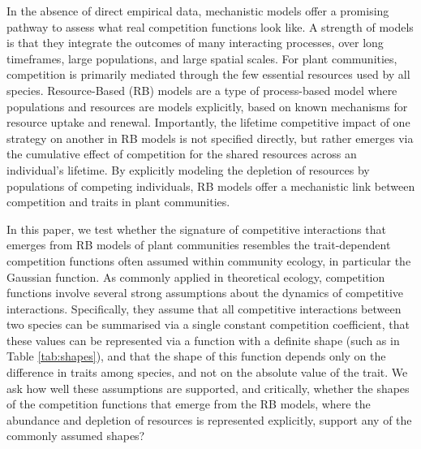 \documentclass[a4paper,11pt]{article}
\begin{document}
In the absence of direct empirical data, mechanistic models offer a promising pathway to assess what real competition functions look like. A strength of models is that they integrate the outcomes of many interacting processes, over long timeframes, large populations, and large spatial scales. For plant communities, competition is primarily mediated through the few essential resources used by all species. Resource-Based (RB) models are a type of process-based model where populations and resources are models explicitly, based on known mechanisms for resource uptake and renewal. Importantly, the lifetime competitive impact of one strategy on another in RB models is not specified directly, but rather emerges via the cumulative effect of competition for the shared resources across an individual's lifetime. By explicitly modeling the depletion of resources by populations of competing individuals, RB models offer a mechanistic link between competition and traits in plant communities. 

In this paper, we test whether the signature of competitive interactions that emerges from RB models of plant communities resembles the trait-dependent competition functions often assumed within community ecology, in particular the Gaussian function. As commonly applied in theoretical ecology, competition functions involve several strong assumptions about the dynamics of competitive interactions. Specifically, they assume that all competitive interactions between two species can be summarised via a single constant competition coefficient, that these values can be represented via a function with a definite shape (such as in Table \ref{tab:shapes}), and that the shape of this function depends only on the difference in traits among species, and not on the absolute value of the trait. We ask how well these assumptions are supported, and critically, whether the shapes of the competition functions that emerge from the RB models, where the abundance and depletion of resources is represented explicitly, support any of the commonly assumed shapes? 
\end{document}
